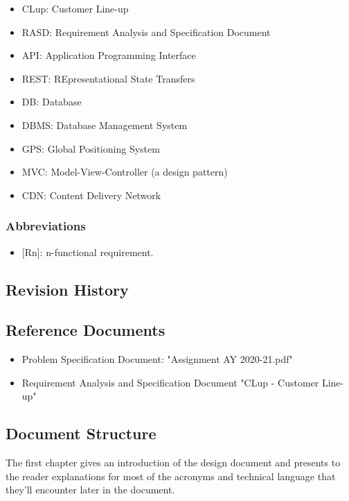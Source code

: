 \begin{itemize}
    \item CLup: Customer Line-up
    \item RASD: Requirement Analysis and Specification Document
    \item API: Application Programming Interface
    \item REST: REpresentational State Transfers
    \item DB: Database
    \item DBMS: Database Management System
    \item GPS: Global Positioning System
    \item MVC: Model-View-Controller (a design pattern)
    \item CDN: Content Delivery Network
\end{itemize}


\subsubsection{Abbreviations}

\begin{itemize}
    \item {[Rn]}: n-functional requirement.
\end{itemize}

\subsection{Revision History}

\subsection{Reference Documents}

\begin{itemize}
    \item Problem Specification Document: "Assignment AY 2020-21.pdf"
    \item Requirement Analysis and Specification Document "CLup - Customer Line-up"
\end{itemize}

\subsection{Document Structure}

The first chapter gives an introduction of the design document and presents to the reader explanations for most of the acronyms and technical language that they'll encounter later in the document.

